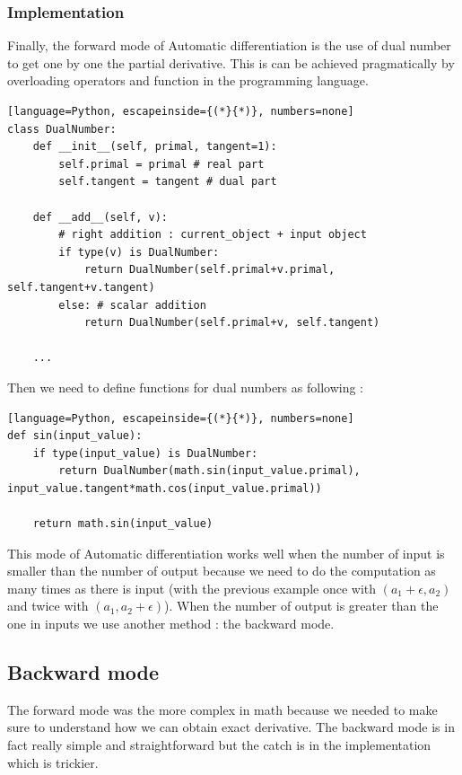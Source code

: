 \documentclass[12pt]{article}
\begin{document}
\subsubsection{Implementation}

Finally, the forward mode of Automatic differentiation is the use of dual number to get one by one the partial derivative. This is can be achieved pragmatically by overloading operators and function in the programming language.

\begin{lstlisting}[language=Python, escapeinside={(*}{*)}, numbers=none]
class DualNumber:
    def __init__(self, primal, tangent=1):
        self.primal = primal # real part
        self.tangent = tangent # dual part
    
    def __add__(self, v):
        # right addition : current_object + input object
        if type(v) is DualNumber:
            return DualNumber(self.primal+v.primal, self.tangent+v.tangent)
        else: # scalar addition
            return DualNumber(self.primal+v, self.tangent)
    
    ...
\end{lstlisting}

Then we need to define functions for dual numbers as following : 


\begin{lstlisting}[language=Python, escapeinside={(*}{*)}, numbers=none]
def sin(input_value):
    if type(input_value) is DualNumber:
        return DualNumber(math.sin(input_value.primal), input_value.tangent*math.cos(input_value.primal))
    
    return math.sin(input_value)
\end{lstlisting}


This mode of Automatic differentiation works well when the number of input is smaller than the number of output because we need to do the computation as many times as there is input (with the previous example once with $(a_1 + \epsilon, a_2)$ and twice with $(a_1, a_2+\epsilon)$). When the number of output is greater than the one in inputs we use another method : the backward mode.


\subsection{Backward mode}

The forward mode was the more complex in math because we needed to make sure to understand how we can obtain exact derivative. The backward mode is in fact really simple and straightforward but the catch is in the implementation which is trickier. 
\end{document}
